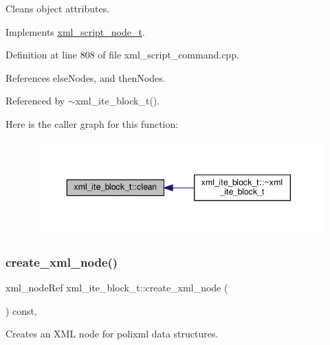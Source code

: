Cleans object attributes. 



Implements \hyperlink{classxml__script__node__t_a2be778f2caef531c55b36c2bf2c996e2}{xml\+\_\+script\+\_\+node\+\_\+t}.



Definition at line 808 of file xml\+\_\+script\+\_\+command.\+cpp.



References else\+Nodes, and then\+Nodes.



Referenced by $\sim$xml\+\_\+ite\+\_\+block\+\_\+t().

Here is the caller graph for this function\+:
\nopagebreak
\begin{figure}[H]
\begin{center}
\leavevmode
\includegraphics[width=343pt]{df/d5b/classxml__ite__block__t_ab5a5590475fc25a5601daefd8a0deac3_icgraph}
\end{center}
\end{figure}
\mbox{\label{classxml__ite__block__t_a1b9744c412acd0ded712ab4c8956ce27}} 
\subsubsection{\texorpdfstring{create\+\_\+xml\+\_\+node()}{create\_xml\_node()}}
{\footnotesize\ttfamily xml\+\_\+node\+Ref xml\+\_\+ite\+\_\+block\+\_\+t\+::create\+\_\+xml\+\_\+node (\begin{DoxyParamCaption}{ }\end{DoxyParamCaption}) const\hspace{0.3cm}{\ttfamily [override]}, {\ttfamily [virtual]}}



Creates an X\+ML node for polixml data structures. 



